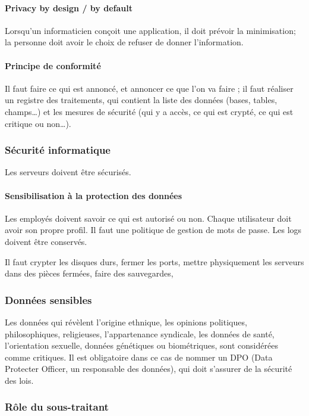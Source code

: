 \documentclass[10pt,a4paper,french]{article}
\begin{document}
\paragraph{Privacy by design / by default}
Lorsqu'un informaticien conçoit une application, il doit prévoir la minimisation; la personne doit avoir le choix de refuser de donner l'information.

\paragraph{Principe de conformité}
Il faut faire ce qui est annoncé, et annoncer ce que l'on va faire ; il faut réaliser un registre des traitements, qui contient la liste des données (bases, tables, champs\ldots) et les mesures de sécurité (qui y a accès, ce qui est crypté, ce qui est critique ou non\ldots).

\subsubsection{Sécurité informatique}

Les serveurs doivent être sécurisés.

\paragraph{Sensibilisation à la protection des données}
Les employés doivent savoir ce qui est autorisé ou non. Chaque utilisateur doit avoir son propre profil. Il faut une politique de gestion de mots de passe. Les logs doivent être conservés.

Il faut crypter les disques durs, fermer les ports, mettre physiquement les serveurs dans des pièces fermées, faire des sauvegardes,

\subsubsection{Données sensibles}

Les données qui révèlent l'origine ethnique, les opinions politiques, philosophiques, religieuses, l'appartenance syndicale, les données de santé, l'orientation sexuelle, données génétiques ou biométriques, sont considérées comme critiques. Il est obligatoire dans ce cas de nommer un DPO (Data Protecter Officer, un responsable des données), qui doit s'assurer de la sécurité des lois.

\subsubsection{Rôle du sous-traitant}
\end{document}
